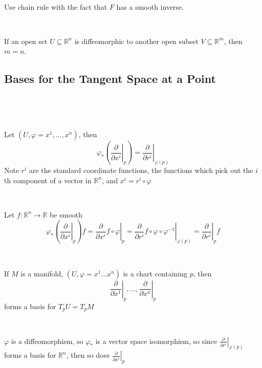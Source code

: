 \documentclass{article}
\begin{document}
\begin{customproof}
  \

  Use chain rule with the fact that $F$ has a smooth inverse.
\end{customproof}

\begin{corollary}
  \

  If an open set $U \subseteq \mathbb{R}^n$ is diffeomorphic to another open subset $V \subseteq \mathbb{R}^m$, then $m = n$.
\end{corollary}

\subsection{Bases for the Tangent Space at a Point}
\

\begin{proposition}
  \

  Let $(U, \varphi = x^1, \dots, x^n)$, then $$\varphi_*(\left.\frac{\partial}{\partial x^i} \right\vert_p) = \left.\frac{\partial}{\partial r^i} \right\vert_{\varphi(p)}$$Note $r^i$ are the standard coordinate functions, the functions which pick out the $i$th component of a vector in $\mathbb{R}^n$, and $x^i = r^i \circ \varphi$
\end{proposition}

\begin{customproof}
  \

  Let $f: \mathbb{R}^n \to \mathbb{R}$ be smooth$$\varphi_*(\left.\frac{\partial}{\partial x^i}\right\vert_p)f = \left.\frac{\partial}{\partial x^i}f \circ \varphi\right\vert_{p} = \left.\frac{\partial}{\partial r^i} f \circ \varphi \circ \varphi ^{-1} \right\vert_{\varphi(p)} = \left.\frac{\partial}{\partial r^i}\right\vert_p f$$
\end{customproof}

\begin{proposition}
  \

  If $M$ is a manifold, $(U, \varphi = x^1 \dots x^n)$ is a chart containing $p$, then $$\left.\frac{\partial}{\partial x^1}\right\vert_p, \dots, \left.\frac{\partial}{\partial x^n}\right\vert_p$$forms a basis for $T_pU = T_pM$
\end{proposition}

\begin{customproof}
  \

  $\varphi$ is a diffeomorphism, so $\varphi_*$ is a vector space isomorphism, so since $\left.\frac{\partial}{\partial r^i}\right\vert_{\varphi(p)}$ forms a basis for $\mathbb{R}^n$, then so does $\left.\frac{\partial}{\partial x^i}\right\vert_p$
\end{customproof}
\end{document}
